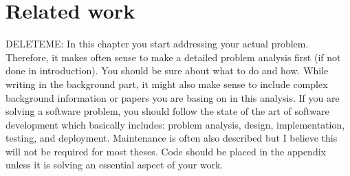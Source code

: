 \chapter{Related work}
\label{mainone}
DELETEME: In this chapter you start addressing your actual problem. Therefore, it makes often sense to make a detailed problem analysis first (if not done in introduction). You should be sure about what to do and how. While writing in the background part, it might also make sense to include complex background information or papers you are basing on in this analysis. If you are solving a software problem, you should follow the state of the art of software development which basically includes: problem analysis, design, implementation, testing, and deployment. Maintenance is often also described but I believe this will not be required for most theses. Code should be placed in the appendix unless it is solving an essential aspect of your work.

 